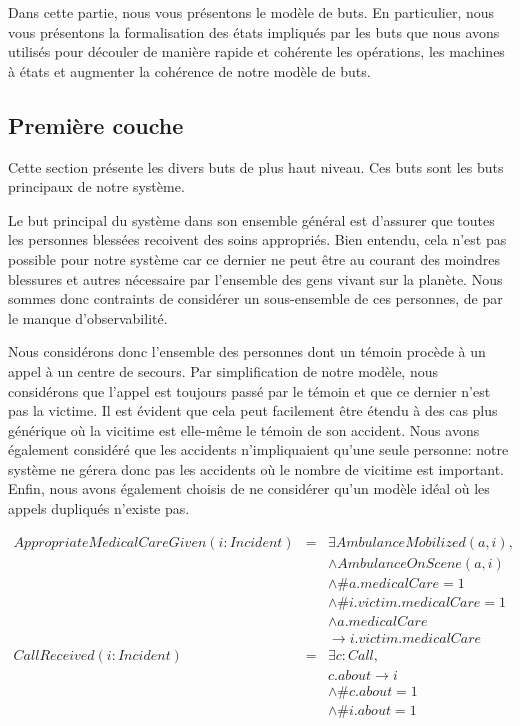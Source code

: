 Dans cette partie, nous vous présentons le modèle de buts. En 
particulier, nous vous présentons la formalisation des états impliqués
par les buts que nous avons
utilisés pour découler de manière rapide et cohérente les opérations, les
machines à états et augmenter la cohérence de notre modèle de buts.

\subsection{Première couche}

	Cette section présente les divers buts de plus haut niveau. Ces buts
	sont les buts principaux de notre système. 


	Le but principal du système dans son ensemble général est
	d'assurer que toutes les personnes blessées recoivent des soins 
	appropriés. Bien entendu, cela n'est pas possible pour notre
	système car ce dernier ne peut être au courant des moindres blessures
	et autres nécessaire par l'ensemble des gens vivant sur la planète.
	Nous sommes donc contraints de considérer un sous-ensemble de ces personnes,
	de par le manque d'observabilité. 
	
	Nous considérons donc l'ensemble des personnes dont un témoin procède à 
	un appel à un centre de secours. Par simplification de notre modèle, nous
	considérons que l'appel est toujours passé par le témoin et que ce dernier
	n'est pas la victime. Il est évident que cela peut facilement être étendu
	à des cas plus générique où la vicitime est elle-même le témoin de son
	accident. Nous avons également considéré que les accidents n'impliquaient
	qu'une seule personne: notre système ne gérera donc pas les accidents où
	le nombre de vicitime est important. Enfin, nous avons également choisis
	de ne considérer qu'un modèle idéal où les appels dupliqués n'existe pas.

	\singlespacing
	\begin{equation*}
		\begin{array}{rcl}
			AppropriateMedicalCareGiven(i:Incident)
			& = & \exists AmbulanceMobilized(a, i), \\
			&   & \wedge AmbulanceOnScene(a, i) \\
			&   & \wedge \#a.medicalCare = 1 \\
			&   & \wedge \#i.victim.medicalCare = 1 \\
			&   & \wedge a.medicalCare \\
			&   & \rightarrow i.victim.medicalCare \\ 
			CallReceived(i:Incident)
			& = & \exists c: Call, \\
			&   & c.about \rightarrow i \\
			&   & \wedge \#c.about = 1 \\
			&   & \wedge \#i.about = 1 \\
		\end{array}
	\end{equation*}
	\onehalfspacing

